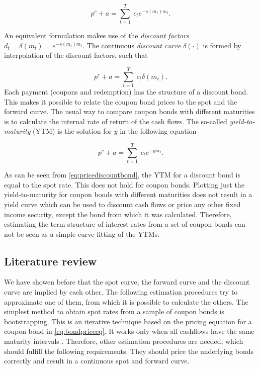 \begin{equation}
  \label{eq:bondpriceeq}
  p^c+a = \sum_{t=1}^T \ c_t e^{-s(m_t)m_t}.
\end{equation}

An equivalent formulation makes use of the \emph{discount factors} $d_t=\delta(m_t)=e^{-s(m_t)m_t}$. The continuous \emph{discount curve} $\delta(\cdot)$ is formed by interpolation of the discount factors, such that


\begin{equation*}
  \label{bondprceq2}
  p^c+a=\sum_{t=1}^T \ c_t \delta(m_t). 
\end{equation*}
Each payment (coupons and redemption) has the structure of a discount bond. This makes it possible to relate the coupon bond prices to the spot and the forward curve. The usual way to compare coupon bonds with different maturities is to calculate the internal rate of return of the cash flows. The so-called \emph{yield-to-maturity} (YTM) is the solution for $y$ in the following equation

\begin{equation}
   \label{eq:yield}
   p^c+a=\sum_{t=1}^T \ c_t e^{-ym_t}.
 \end{equation}

As can be seen from \eqref{eq:pricediscountbond}, the YTM for a discount bond is equal to the spot rate. This does not hold for coupon bonds. Plotting just the yield-to-maturity for coupon bonds with different maturities does not result in a yield curve which can be used to discount cash flows or price any other fixed income security, except the bond from which it was calculated. Therefore, estimating the term structure of interest rates from a set of coupon bonds can not be seen as a simple curve-fitting of the YTMs.

\subsection{Literature review}

We have showen before that the spot curve, the forward curve and the discount curve are implied by each other. The following estimation procedures try to approximate one of them, from which it is possible to calculate the others. The simplest method to obtain spot rates from a sample of coupon bonds is bootstrapping. This is an iterative technique based on the pricing equation for a coupon bond in \eqref{eq:bondpriceeq}. It works only when all cashflows have the same maturity intervals \citep[see, e.g.][]{Hagan2006}. Therefore, other estimation procedures are needed, which should fulfill the following requirements. They should price the underlying bonds correctly and result in a continuous spot and forward curve. 

